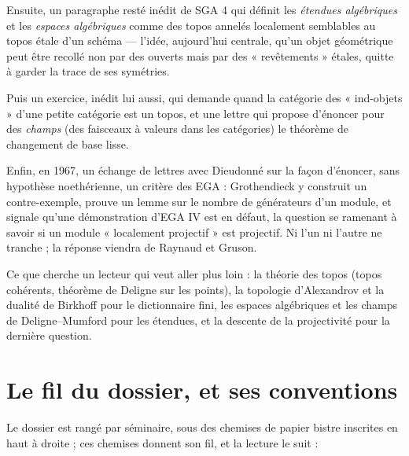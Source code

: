 \documentclass[11pt,a4paper]{article}
\begin{document}
\begin{resume}
Ensuite, un paragraphe resté inédit de SGA 4 qui définit les \emph{étendues
algébriques} et les \emph{espaces algébriques} comme des topos annelés
localement semblables au topos étale d'un schéma --- l'idée, aujourd'hui
centrale, qu'un objet géométrique peut être recollé non par des ouverts mais
par des « revêtements » étales, quitte à garder la trace de ses symétries.

Puis un exercice, inédit lui aussi, qui demande quand la catégorie des
« ind-objets » d'une petite catégorie est un topos, et une lettre qui
propose d'énoncer pour des \emph{champs} (des faisceaux à valeurs dans les
catégories) le théorème de changement de base lisse.

Enfin, en 1967, un échange de lettres avec Dieudonné sur la façon d'énoncer,
sans hypothèse noethérienne, un critère des EGA : Grothendieck y construit un
contre-exemple, prouve un lemme sur le nombre de générateurs d'un module, et
signale qu'une démonstration d'EGA IV est en défaut, la question se ramenant à
savoir si un module « localement projectif » est projectif. Ni l'un ni
l'autre ne tranche ; la réponse viendra de Raynaud et Gruson.

Ce que cherche un lecteur qui veut aller plus loin : la théorie des topos
(topos cohérents, théorème de Deligne sur les points), la topologie
d'Alexandrov et la dualité de Birkhoff pour le dictionnaire fini, les espaces
algébriques et les champs de Deligne--Mumford pour les étendues, et la
descente de la projectivité pour la dernière question.

\end{resume}

\section*{Le fil du dossier, et ses conventions}

Le dossier est rangé par séminaire, sous des chemises de papier bistre
inscrites en haut à droite ; ces chemises donnent son fil, et la lecture le
suit :
\end{document}
